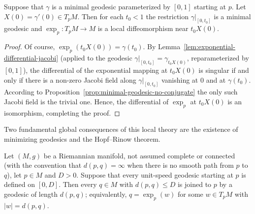 \begin{corollary}
\label{cor:exponential-local-diffeomorphism}
\label{star}
\leanok
Suppose that $\gamma$ is a minimal geodesic parameterized by $[0,1]$
starting at $p$. Let $X(0)=\gamma'(0)\in T_pM$. Then for each
$t_0<1$ the restriction $\gamma|_{[0,t_0]}$ is a minimal geodesic
and $\exp_p\colon T_pM\to M$ is a local diffeomorphism near
$t_0X(0)$.
\end{corollary}

\begin{proof}
\leanok
Of course, $\exp_p(t_0X(0))=\gamma(t_0)$. By
Lemma~\ref{lem:exponential-differential-jacobi} (applied to the
geodesic $\gamma|_{[0,t_0]}=\gamma_{t_0X(0)}$, reparameterized by
$[0,1]$), the differential of the
exponential mapping at $t_0X(0)$ is singular if and only if there
is a non-zero
Jacobi field along $\gamma|_{[0,t_0]}$ vanishing at $0$ and at
$\gamma(t_0)$. According
to  Proposition~\ref{prop:minimal-geodesic-no-conjugate} the only such Jacobi field is the
trivial one. Hence, the differential of $\exp_p$ at $t_0X(0)$
is an isomorphism, completing the proof.
\end{proof}

Two fundamental global consequences of this local theory are the
existence of minimizing geodesics and the Hopf--Rinow theorem.

\begin{lemma}
\label{lem:minimizing-geodesic-exists}
Let $(M,g)$ be a Riemannian manifold, not assumed complete or
connected (with the convention that $d(p,q)=\infty$ when there is
no smooth path from $p$ to $q$), let $p\in M$ and $D>0$. Suppose
that every unit-speed
geodesic starting at $p$ is defined on $[0,D]$. Then every $q\in
M$ with $d(p,q)\le D$ is joined to $p$ by a geodesic of length
$d(p,q)$; equivalently, $q=\exp_p(w)$ for some $w\in T_pM$ with
$|w|=d(p,q)$.
\end{lemma}

